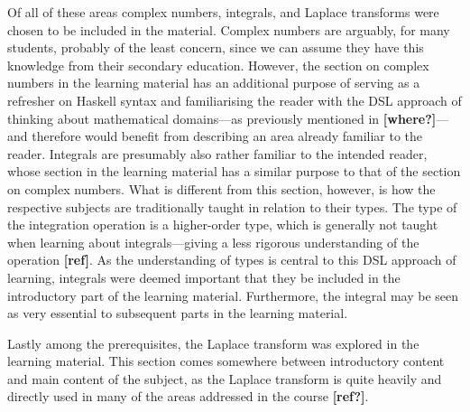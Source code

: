 Of all of these areas complex numbers, integrals, and Laplace transforms were chosen to be included in the material. Complex numbers are arguably, for many students, probably of the least concern, since we can assume they have this knowledge from their secondary education. However, the section on complex numbers in the learning material has an additional purpose of serving as a refresher on Haskell syntax and familiarising the reader with the DSL approach of thinking about mathematical domains---as previously mentioned in \textbf{[where?]}---and therefore would benefit from describing an area already familiar to the reader. Integrals are presumably also rather familiar to the intended reader, whose section in the learning material has a similar purpose to that of the section on complex numbers. What is different from this section, however, is how the respective subjects are traditionally taught in relation to their types. The type of the integration operation is a higher-order type, which is generally not taught when learning about integrals---giving a less rigorous understanding of the operation \textbf{[ref]}. As the understanding of types is central to this DSL approach of learning, integrals were deemed important that they be included in the introductory part of the learning material. Furthermore, the integral may be seen as very essential to subsequent parts in the learning material. 

Lastly among the prerequisites, the Laplace transform was explored in the learning material. This section comes somewhere between introductory content and main content of the subject, as the Laplace transform is quite heavily and directly used in many of the areas addressed in the course \textbf{[ref?]}. 



\iffalse %
